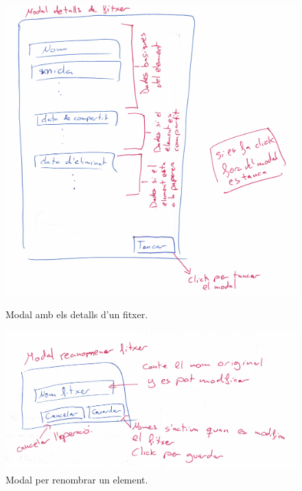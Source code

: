 \begin{figure}[H]
    \centering
    \begin{minipage}{0.48\textwidth}
        \centering
        \includegraphics[width=\linewidth]{Figures/interficies/react-modal-detalls-fitxer.jpg}
        \caption{Modal amb els detalls d'un fitxer.}
        \label{fig:react-modal-detalls-fitxer}
    \end{minipage}\hfill
    \begin{minipage}{0.48\textwidth}
        \centering
        \includegraphics[width=\linewidth]{Figures/interficies/react-modal-renomenar-fitxer.jpg}
        \caption{Modal per renombrar un element.}
        \label{fig:react-modal-renomenar-fitxer}
    \end{minipage}
\end{figure}

